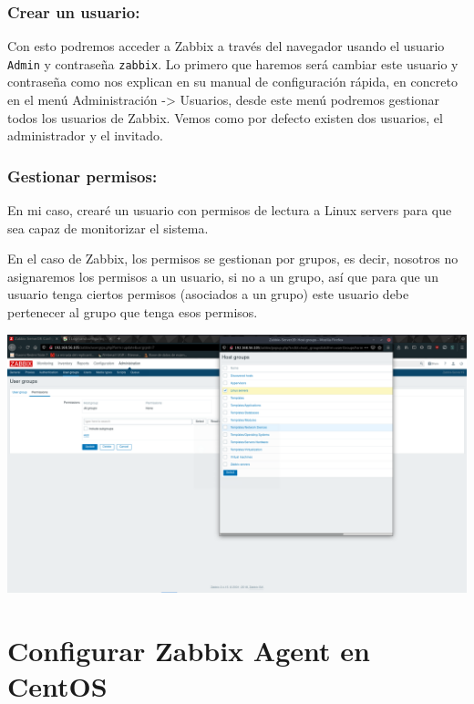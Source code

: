 \documentclass[12pt, spanish]{article}
\begin{document}
\subsubsection{Crear un usuario:}
Con esto podremos acceder a Zabbix a través del navegador usando el usuario \texttt{Admin} y contraseña \texttt{zabbix}. Lo primero que haremos será cambiar este usuario y contraseña como nos explican en su manual de configuración rápida\cite{zabbix_quickstart}, en concreto en el menú Administración -> Usuarios, desde este menú podremos gestionar todos los usuarios de Zabbix. Vemos como por defecto existen dos usuarios, el administrador y el invitado. 


\subsubsection{Gestionar permisos:}

En mi caso, crearé un usuario con permisos de lectura a Linux servers para que sea capaz de monitorizar el sistema.

En el caso de Zabbix, los permisos se gestionan por grupos, es decir, nosotros no asignaremos los permisos a un usuario, si no a un grupo, así que para que un usuario tenga ciertos permisos (asociados a un grupo) este usuario debe pertenecer al grupo que tenga esos permisos.

\begin{center}
\includegraphics[scale=0.25]{permisos_zabbix.png}
\end{center}



\section{Configurar Zabbix Agent en CentOS}
\end{document}
